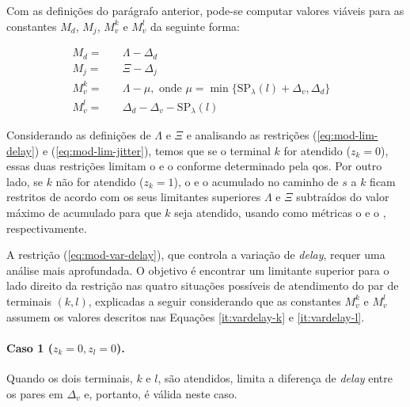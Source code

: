Com  as definições  do  parágrafo anterior,  pode-se computar  valores
viáveis para as constantes $M_d$, $M_j$, $M_v^k$ e $M_v^l$ da seguinte
forma:

\begin{align}
  M_d = & \quad \Lambda-\Delta_d & \label{it:delay} \\
  M_j = & \quad \Xi-\Delta_j & \label{it:jitter} \\
  M_v^k = & \quad \Lambda-\mu, \text{ onde } \mu=\min\{\text{SP}_\lambda(l)+\Delta_v,\Delta_d\} & \label{it:vardelay-k}\\
  M_v^l = & \quad \Delta_d - \Delta_v - \text{SP}_\lambda(l) & \label{it:vardelay-l}
\end{align}

Considerando  as  definições de  $\Lambda$  e  $\Xi$ e  analisando  as
restrições (\ref{eq:mod-lim-delay}) e (\ref{eq:mod-lim-jitter}), temos
que se o terminal $k$ for  atendido ($z_k = 0$), essas duas restrições
limitam o {\delay} e o  {\jitter} conforme determinado pela \gls{qos}.
Por outro lado,  se $k$ não for  atendido ($z_k = 1$), o  {\delay} e o
{\jitter} acumulado no caminho de $s$  a $k$ ficam restritos de acordo
com  os seus  limitantes superiores  $\Lambda$ e  $\Xi$ subtraídos  do
valor  máximo de  acumulado para  que $k$  seja atendido,  usando como
métricas o {\delay} e o {\jitter}, respectivamente.

A restrição (\ref{eq:mod-var-delay}), que  controla a variação de {\em
  delay}, requer uma análise mais aprofundada.  O objetivo é encontrar
um  limitante superior  para o  lado direito  da restrição  nas quatro
situações  possíveis de  atendimento  do par  de  terminais $(k,  l)$,
explicadas a seguir  considerando que as constantes  $M^k_v$ e $M^l_v$
assumem  os valores  descritos  nas  Equações \eqref{it:vardelay-k}  e
\eqref{it:vardelay-l}.


\noindent\paragraph*{{\bf Caso  1} ($z_k =  0, z_l = 0$).}   Quando os
dois  terminais, $k$  e  $l$,  são atendidos,  limita  a diferença  de
\textit{delay}  entre os  pares em  $\Delta_v$ e,  portanto, é  válida
neste caso.

